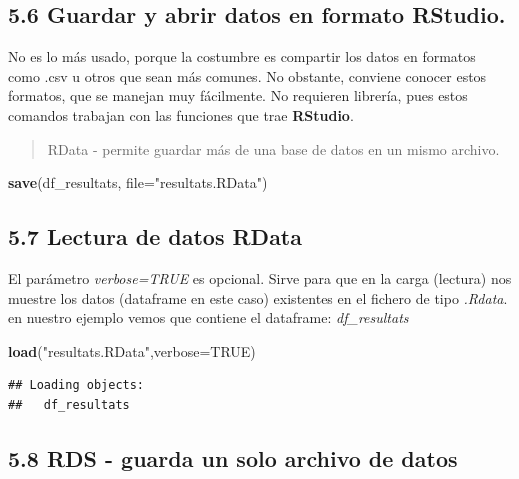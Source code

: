 \documentclass[
]{article}
\newenvironment{Shaded}{\begin{snugshade}}{\end{snugshade}}
\newcommand{\AttributeTok}[1]{\textcolor[rgb]{0.13,0.29,0.53}{#1}}
\newcommand{\ConstantTok}[1]{\textcolor[rgb]{0.56,0.35,0.01}{#1}}
\newcommand{\FunctionTok}[1]{\textcolor[rgb]{0.13,0.29,0.53}{\textbf{#1}}}
\newcommand{\NormalTok}[1]{#1}
\newcommand{\StringTok}[1]{\textcolor[rgb]{0.31,0.60,0.02}{#1}}
\begin{document}
\hypertarget{guardar-y-abrir-datos-en-formato-rstudio.}{%
\subsection{5.6 Guardar y abrir datos en formato
RStudio.}\label{guardar-y-abrir-datos-en-formato-rstudio.}}

No es lo más usado, porque la costumbre es compartir los datos en
formatos como .csv u otros que sean más comunes. No obstante, conviene
conocer estos formatos, que se manejan muy fácilmente. No requieren
librería, pues estos comandos trabajan con las funciones que trae
\textbf{RStudio}.

\begin{quote}
RData - permite guardar más de una base de datos en un mismo archivo.
\end{quote}

\begin{Shaded}
\begin{Highlighting}[]
\FunctionTok{save}\NormalTok{(df\_resultats, }\AttributeTok{file=}\StringTok{"resultats.RData"}\NormalTok{)}
\end{Highlighting}
\end{Shaded}

\hypertarget{lectura-de-datos-rdata}{%
\subsection{5.7 Lectura de datos RData}\label{lectura-de-datos-rdata}}

El parámetro \emph{verbose=TRUE} es opcional. Sirve para que en la carga
(lectura) nos muestre los datos (dataframe en este caso) existentes en
el fichero de tipo \emph{.Rdata}. en nuestro ejemplo vemos que contiene
el dataframe: \emph{df\_resultats}

\begin{Shaded}
\begin{Highlighting}[]
\FunctionTok{load}\NormalTok{(}\StringTok{"resultats.RData"}\NormalTok{,}\AttributeTok{verbose=}\ConstantTok{TRUE}\NormalTok{)}
\end{Highlighting}
\end{Shaded}

\begin{verbatim}
## Loading objects:
##   df_resultats
\end{verbatim}

\hypertarget{rds---guarda-un-solo-archivo-de-datos}{%
\subsection{5.8 RDS - guarda un solo archivo de
datos}\label{rds---guarda-un-solo-archivo-de-datos}}
\end{document}
